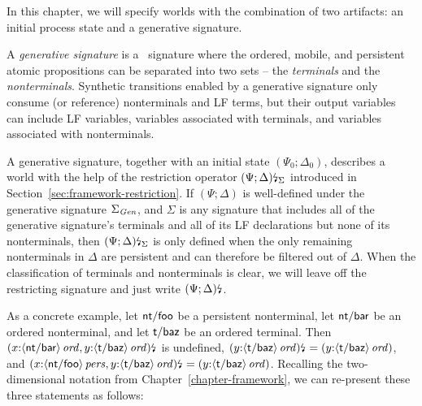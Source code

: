 In this chapter, we will specify worlds with the combination of two
artifacts: an initial process state and a generative signature.

\bigskip
\begin{definition}\label{def:gensig}
  A {\em generative signature} is a \sls~signature where the ordered,
  mobile, and persistent atomic propositions can be separated into two
  sets -- the {\em terminals} and the {\em nonterminals}. Synthetic
  transitions enabled by a generative signature only consume (or
  reference) nonterminals and LF terms, but their output variables can
  include LF variables, variables associated with terminals, and
  variables associated with nonterminals.
\end{definition}
\bigskip


\noindent
A generative signature, together with an initial
state $(\Psi_0; \Delta_0)$, describes a world with the help of the
restriction operator ${(\Psi; \Delta)}{\mbox{\lightning}}_{\Sigma}$ introduced
in Section~\ref{sec:framework-restriction}. If $(\Psi; \Delta)$ is
well-defined under the generative signature $\Sigma_{\it Gen}$, and
$\Sigma$ is any signature that includes all of the generative
signature's terminals and all of its LF declarations but none of its
nonterminals, then ${(\Psi; \Delta)}{\mbox{\lightning}}_{\Sigma}$ is only
defined when the only remaining nonterminals in $\Delta$ are
persistent and can therefore be filtered out of $\Delta$.  
When the
classification of terminals and nonterminals is clear, we will leave
off the restricting signature and just write ${(\Psi;
  \Delta)}{\mbox{\lightning}}_{}$. 

As a concrete example, let ${\sf nt/foo}$ be a persistent nonterminal,
let ${\sf nt/bar}$ be an ordered nonterminal, and let ${\sf t/baz}$ be
an ordered terminal. Then ${(x{:}{\langle {\sf
      nt/bar} \rangle}\,{{\it ord}}, y{:}{\langle {\sf t/baz} \rangle}\,{{\it ord}})}{\mbox{\lightning}}_{}$ is undefined,
${(y{:}{\langle {\sf t/baz} \rangle}\,{{\it ord}})}{\mbox{\lightning}}_{} =
{(y{:}{\langle {\sf t/baz} \rangle}\,{{\it ord}})}$, and
${(x{:}{\langle {\sf nt/foo} \rangle}\,{{\it pers}}, y{:}{\langle {\sf
      t/baz} \rangle}\,{{\it ord}})}{\mbox{\lightning}}_{} = {(y{:}{\langle {\sf t/baz} \rangle}\,{{\it ord}})}$.  Recalling the
two-dimensional notation from Chapter~\ref{chapter-framework}, we can
re-present these three statements as follows:

